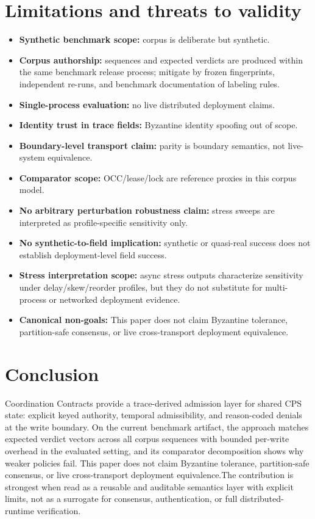 \documentclass[11pt]{article}
\newcommand{\nongoals}{This paper does not claim Byzantine tolerance, partition-safe consensus, or live cross-transport deployment equivalence.}
\begin{document}
\section{Limitations and threats to validity}

\begin{itemize}[leftmargin=1.5em]
\item \textbf{Synthetic benchmark scope:} corpus is deliberate but synthetic.
\item \textbf{Corpus authorship:} sequences and expected verdicts are produced within the same benchmark release process; mitigate by frozen fingerprints, independent re-runs, and benchmark documentation of labeling rules.
\item \textbf{Single-process evaluation:} no live distributed deployment claims.
\item \textbf{Identity trust in trace fields:} Byzantine identity spoofing out of scope.
\item \textbf{Boundary-level transport claim:} parity is boundary semantics, not live-system equivalence.
\item \textbf{Comparator scope:} OCC/lease/lock are reference proxies in this corpus model.
\item \textbf{No arbitrary perturbation robustness claim:} stress sweeps are interpreted as profile-specific sensitivity only.
\item \textbf{No synthetic-to-field implication:} synthetic or quasi-real success does not establish deployment-level field success.
\item \textbf{Stress interpretation scope:} async stress outputs characterize sensitivity under delay/skew/reorder profiles, but they do not substitute for multi-process or networked deployment evidence.
\item \textbf{Canonical non-goals:} \nongoals
\end{itemize}

\section{Conclusion}

Coordination Contracts provide a trace-derived admission layer for shared CPS state: explicit keyed authority, temporal admissibility, and reason-coded denials at the write boundary. On the current benchmark artifact, the approach matches expected verdict vectors across all corpus sequences with bounded per-write overhead in the evaluated setting, and its comparator decomposition shows why weaker policies fail. \nongoals The contribution is strongest when read as a reusable and auditable semantics layer with explicit limits, not as a surrogate for consensus, authentication, or full distributed-runtime verification.
\end{document}
